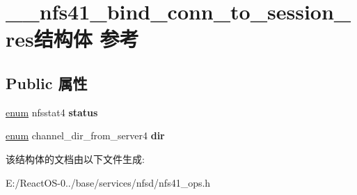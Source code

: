 \hypertarget{struct____nfs41__bind__conn__to__session__res}{}\section{\+\_\+\+\_\+nfs41\+\_\+bind\+\_\+conn\+\_\+to\+\_\+session\+\_\+res结构体 参考}
\label{struct____nfs41__bind__conn__to__session__res}
\subsection*{Public 属性}
\begin{DoxyCompactItemize}
\item 
\mbox{\label{struct____nfs41__bind__conn__to__session__res_ad04615acc7806f414ee5062ff29cc50c}} 
\hyperlink{interfaceenum}{enum} nfsstat4 {\bfseries status}
\item 
\mbox{\label{struct____nfs41__bind__conn__to__session__res_a1ea4a1563af21e54366eee922170ff9b}} 
\hyperlink{interfaceenum}{enum} channel\+\_\+dir\+\_\+from\+\_\+server4 {\bfseries dir}
\end{DoxyCompactItemize}


该结构体的文档由以下文件生成\+:\begin{DoxyCompactItemize}
\item 
E\+:/\+React\+O\+S-\/0../base/services/nfsd/nfs41\+\_\+ops.\+h\end{DoxyCompactItemize}
